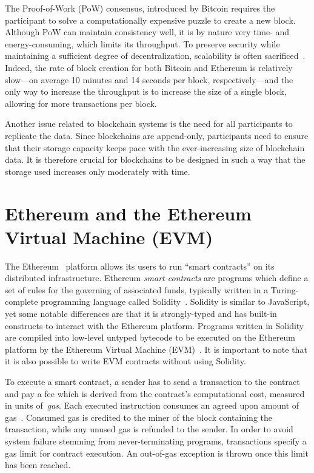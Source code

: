 The Proof-of-Work (PoW) consensus, introduced by Bitcoin requires the participant to solve a computationally expensive puzzle to create a new block. Although PoW can maintain consistency well, it is by nature very time- and energy-consuming, which limits its throughput.
To preserve security while maintaining a sufficient degree of decentralization, scalability is often sacrificed~\cite{Xie2019}.
Indeed, the rate of block creation for both Bitcoin and Ethereum is relatively slow---on average 10 minutes and 14 seconds per block, respectively---and the only way to increase the throughput is to increase the size of a single block, allowing for more transactions per block.

Another issue related to blockchain systems is the need for all participants to replicate the data.
Since blockchains are append-only, participants need to ensure that their storage capacity keeps pace with the ever-increasing size of blockchain data. 
It is therefore crucial for blockchains to be designed in such a way that the storage used increases only moderately with time.


\section{Ethereum and the Ethereum Virtual Machine (EVM)}
The Ethereum~\cite{Buterin2014} platform allows its users to run ``smart contracts'' on its distributed infrastructure. Ethereum \emph{smart contracts} are programs which define a set of rules for the governing of associated funds, typically written in a Turing-complete programming language called Solidity~\cite{Dannen:2017:IES:3103305}. Solidity is similar to JavaScript, yet some notable differences are that it is strongly-typed and has built-in constructs to interact with the Ethereum platform. Programs written in Solidity are compiled into low-level untyped bytecode to be executed on the Ethereum platform by the Ethereum Virtual Machine (EVM)~\cite{wood2014ethereum}. It is important to note that it is also possible to write EVM contracts without using Solidity.

To execute a smart contract, a sender has to send a transaction to the contract and pay a fee which is derived from the contract's computational cost, measured in units of~\emph{gas}. Each executed instruction consumes an agreed upon amount of gas~\cite{wood2014ethereum}. Consumed gas is credited to the miner of the block containing the transaction, while any unused gas is refunded to the sender. In order to avoid system failure stemming from never-terminating programs, transactions specify a gas limit for contract execution. An out-of-gas exception is thrown once this limit has been reached.

